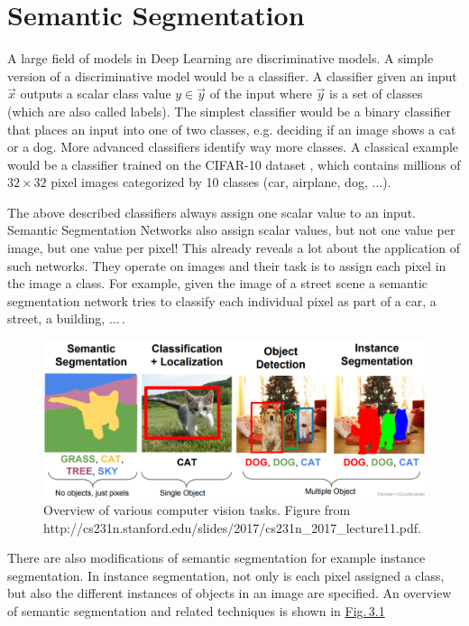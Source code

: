 
\section{Semantic Segmentation} \label{sec:3.1}
A large field of models in Deep Learning are discriminative models. A simple version of a discriminative model would be a classifier. A classifier given an input $\vec{x}$ outputs a scalar class value $y\in\vec{y}$ of the input where $\vec{y}$ is a set of classes (which are also called labels). The simplest classifier would be a binary classifier that places an input into one of two classes, e.g. deciding if an image shows a cat or a dog. More advanced classifiers identify way more classes. A classical example would be a classifier trained on the CIFAR-10 dataset \cite{cifar10}, which contains millions of $32\times32$ pixel images categorized by 10 classes (car, airplane, dog, $\dots$).

The above described classifiers always assign one scalar value to an input. Semantic Segmentation Networks also assign scalar values, but not one value per image, but one value per pixel! This already reveals a lot about the application of such networks. They operate on images and their task is to assign each pixel in the image a class. For example, given the image of a street scene a semantic segmentation network tries to classify each individual pixel as part of a car, a street, a building, $\dots$\,.
%
\begin{figure} \label{fig:3.1}
    \centering
    \includegraphics[width=.8\textwidth]{Chapters/figures/sem_seg.PNG}
    \caption[Overview of various computer vision tasks]{Overview of various computer vision tasks. Figure from\\ http://cs231n.stanford.edu/slides/2017/cs231n\_2017\_lecture11.pdf.}
\end{figure}
%

There are also modifications of semantic segmentation for example instance segmentation. In instance segmentation, not only is each pixel assigned a class, but also the different instances of objects in an image are specified. An overview of semantic segmentation and related techniques is shown in \hyperref[fig:3.1]{Fig.\,3.1}

